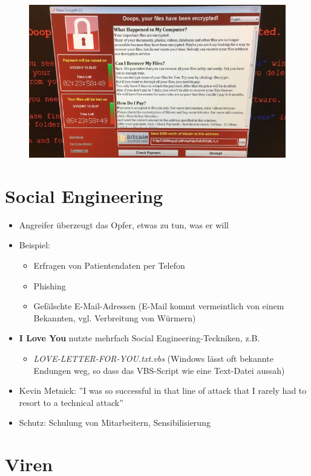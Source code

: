 \documentclass[openany]{book}
\begin{document}
\begin{figure}[h!]
    \centering
    \includegraphics[width=0.45\linewidth]{Pics/WannaCry.PNG}
\end{figure}

\section{Social Engineering}

\begin{itemize}
    \item Angreifer überzeugt das Opfer, etwas zu tun, was er will
    \item Beispiel:
    \begin{itemize}
        \item Erfragen von Patientendaten per Telefon
        \item Phishing
        \item Gefälschte E-Mail-Adressen (E-Mail kommt vermeintlich von einem Bekannten, vgl. Verbreitung von Würmern)
    \end{itemize}
    \item \textbf{I Love You} nutzte mehrfach Social Engineering-Teckniken, z.B.
    \begin{itemize}
        \item \textit{LOVE-LETTER-FOR-YOU.txt.vbs} (Windows lässt oft bekannte Endungen weg, so dass das VBS-Script wie eine Text-Datei aussah)
    \end{itemize}
    \item Kevin Metnick: ''I was so successful in that line of attack that I rarely had to resort to a technical attack''
    \item Schutz: Schulung von Mitarbeitern, Sensibilisierung
\end{itemize}

\section{Viren}
\end{document}
